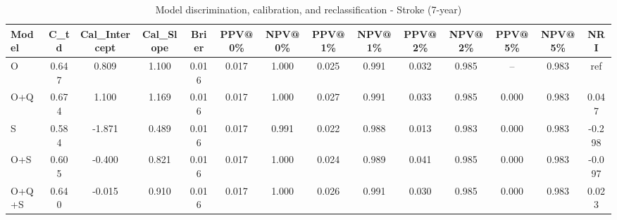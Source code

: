 \begin{table}[htbp]
\centering
\small
\caption{Model discrimination, calibration, and reclassification - Stroke (7-year)}
\label{tab:perf_stroke_7y}
\begin{tabular}{lccccccccccccc}
\toprule
Model & C\_td & Cal\_Intercept & Cal\_Slope & Brier & PPV@0\% & NPV@0\% & PPV@1\% & NPV@1\% & PPV@2\% & NPV@2\% & PPV@5\% & NPV@5\% & NRI \\
\midrule
O & 0.647 & 0.809 & 1.100 & 0.016 & 0.017 & 1.000 & 0.025 & 0.991 & 0.032 & 0.985 & -- & 0.983 & ref \\
O+Q & 0.674 & 1.100 & 1.169 & 0.016 & 0.017 & 1.000 & 0.027 & 0.991 & 0.033 & 0.985 & 0.000 & 0.983 & 0.047 \\
S & 0.584 & -1.871 & 0.489 & 0.016 & 0.017 & 0.991 & 0.022 & 0.988 & 0.013 & 0.983 & 0.000 & 0.983 & -0.298 \\
O+S & 0.605 & -0.400 & 0.821 & 0.016 & 0.017 & 1.000 & 0.024 & 0.989 & 0.041 & 0.985 & 0.000 & 0.983 & -0.097 \\
O+Q+S & 0.640 & -0.015 & 0.910 & 0.016 & 0.017 & 1.000 & 0.026 & 0.991 & 0.030 & 0.985 & 0.000 & 0.983 & 0.023 \\
\bottomrule
\end{tabular}
\end{table}